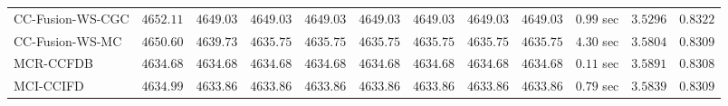 \begin{table}[H]
\begin{tabular}{lrrrrrrrrrrr}
    CC-Fusion-WS-CGC & $      4652.11$ & $      4649.03$ & $      4649.03$ & $      4649.03$ & $      4649.03$ & $      4649.03$ & $      4649.03$ & $      4649.03$ & $         0.99$ sec    & $       3.5296$  & $       0.8322$ \\ 
     CC-Fusion-WS-MC & $      4650.60$ & $      4639.73$ & $      4635.75$ & $      4635.75$ & $      4635.75$ & $      4635.75$ & $      4635.75$ & $      4635.75$ & $         4.30$ sec    & $       3.5804$  & $       0.8309$ \\ 
\cmidrule{1-1} 
           MCR-CCFDB & $      4634.68$ & $      4634.68$ & $      4634.68$ & $      4634.68$ & $      4634.68$ & $      4634.68$ & $      4634.68$ & $      4634.68$ & $         0.11$ sec    & $       3.5891$  & $       0.8308$ \\ 
\cmidrule{1-1} 
           MCI-CCIFD & $      4634.99$ & $      4633.86$ & $      4633.86$ & $      4633.86$ & $      4633.86$ & $      4633.86$ & $      4633.86$ & $      4633.86$ & $         0.79$ sec    & $       3.5839$  & $       0.8309$ \\ 
\bottomrule
\end{tabular}
\end{table}

